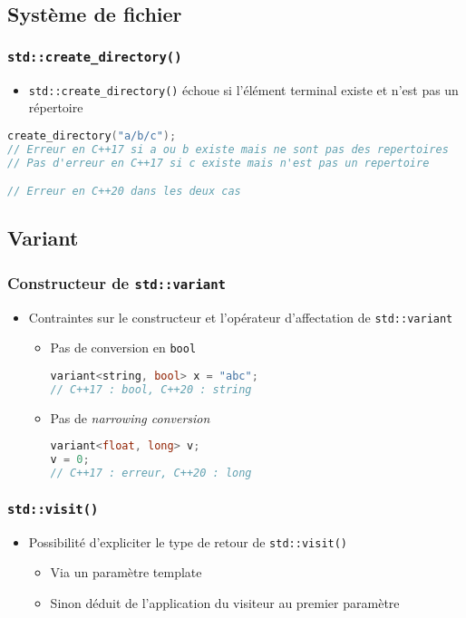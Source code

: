 \documentclass[C++.tex]{subfiles}
\begin{document}
\subsection*{Système de fichier}
\begin{frame}[fragile]
	\frametitle{\lstinline|std::create_directory()|}
	\begin{itemize}
		\item \lstinline|std::create_directory()| échoue si l'élément terminal existe et n'est pas un répertoire
	\end{itemize}

\begin{lstlisting}[language=C++]
create_directory("a/b/c");
// Erreur en C++17 si a ou b existe mais ne sont pas des repertoires
// Pas d'erreur en C++17 si c existe mais n'est pas un repertoire

// Erreur en C++20 dans les deux cas\end{lstlisting}
\end{frame}

\subsection*{Variant}
\begin{frame}[fragile]
	\frametitle{Constructeur de \lstinline|std::variant|}
	\begin{itemize}
		\item Contraintes sur le constructeur et l'opérateur d'affectation de \lstinline|std::variant|
		\begin{itemize}
			\item Pas de conversion en \lstinline|bool|

			\begin{lstlisting}[language=C++]
variant<string, bool> x = "abc";
// C++17 : bool, C++20 : string\end{lstlisting}

			\item Pas de \textit{narrowing conversion}

			\begin{lstlisting}[language=C++]
variant<float, long> v;
v = 0;
// C++17 : erreur, C++20 : long\end{lstlisting}
		\end{itemize}
	\end{itemize}
\end{frame}

\begin{frame}[fragile]
	\frametitle{\lstinline|std::visit()|}
	\begin{itemize}
		\item Possibilité d'expliciter le type de retour de \lstinline|std::visit()|
		\begin{itemize}
			\item Via un paramètre template
			\item Sinon déduit de l'application du visiteur au premier paramètre
		\end{itemize}
	\end{itemize}
\end{frame}
\end{document}
